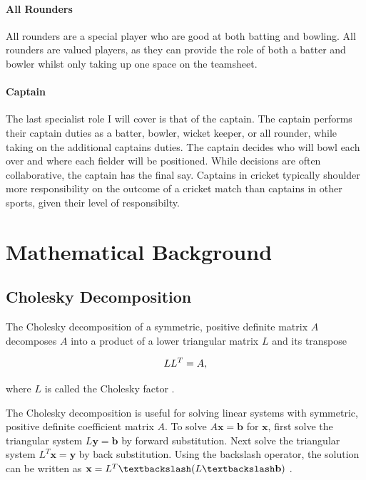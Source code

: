 \documentclass[12pt,a4paper]{report}
\theoremstyle{definition}
\begin{document}
\subsubsection{All Rounders}

All rounders are a special player who are good at both batting and bowling.
All rounders are valued players, as they can provide the role of both a batter and bowler whilst only taking up one space on the teamsheet.

\subsubsection{Captain}

The last specialist role I will cover is that of the captain. 
The captain performs their captain duties as a batter, bowler, wicket keeper, or all rounder, while taking on the additional captains duties.
The captain decides who will bowl each over and where each fielder will be positioned. 
While decisions are often collaborative, the captain has the final say.
Captains in cricket typically shoulder more responsibility on the outcome of a cricket match than captains in other sports, given their level of responsibilty.

\chapter{Mathematical Background}

\section{Cholesky Decomposition} \label{sec:CholDecomp}

The Cholesky decomposition of a symmetric, positive definite matrix $A$ decomposes $A$ into a product of a lower triangular matrix $L$ and its transpose

\begin{equation}
	\centering
	LL^T = A,
\end{equation}

where $L$ is called the Cholesky factor \citep{RasmussenWilliams2006}. 

The Cholesky decomposition is useful for solving linear systems with symmetric, positive definite coefficient matrix $A$. 
To solve $A\textbf{x} = \textbf{b}$ for $\textbf{x}$, first solve the triangular system $L\textbf{y} = \textbf{b}$ by forward substitution. 
Next solve the triangular system $L^T\textbf{x} = \textbf{y}$ by back substitution.
Using the backslash operator, the solution can be written as $\textbf{x} = L^T \textbackslash (L \textbackslash \textbf{b})$ \citep{RasmussenWilliams2006}.
\end{document}

